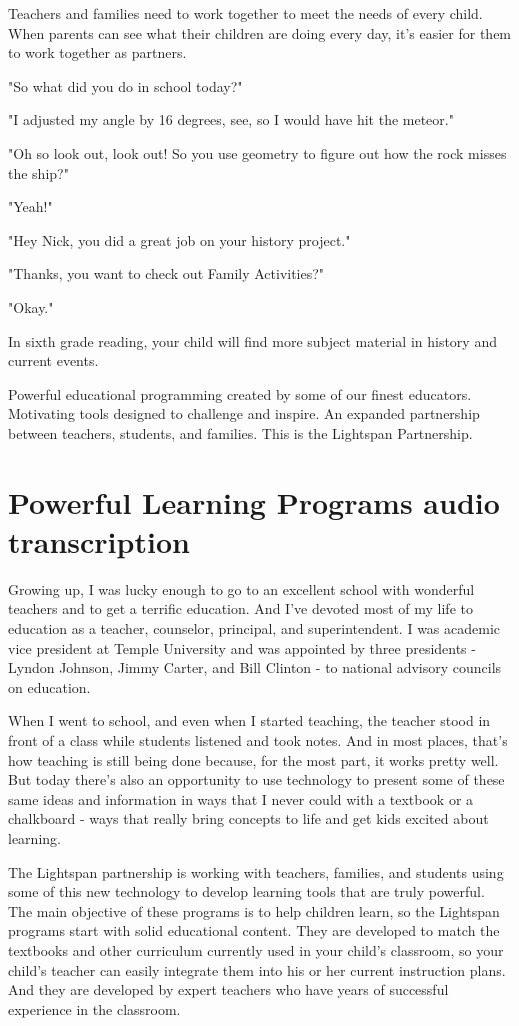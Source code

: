 Teachers and families need to work together to meet the needs of every child.
When parents can see what their children are doing every day, it's easier for them to work together as partners.

"So what did you do in school today?"

"I adjusted my angle by 16 degrees, see, so I would have hit the meteor."

"Oh so look out, look out! So you use geometry to figure out how the rock misses the ship?"

"Yeah!"

"Hey Nick, you did a great job on your history project."

"Thanks, you want to check out Family Activities?"

"Okay."

In sixth grade reading, your child will find more subject material in history and current events.

Powerful educational programming created by some of our finest educators.
Motivating tools designed to challenge and inspire.
An expanded partnership between teachers, students, and families.
This is the Lightspan Partnership.

\section{Powerful Learning Programs audio transcription}

Growing up, I was lucky enough to go to an excellent school with wonderful teachers and to get a terrific education.
And I've devoted most of my life to education as a teacher, counselor, principal, and superintendent.
I was academic vice president at Temple University and was appointed by three presidents - Lyndon Johnson, Jimmy Carter, and Bill Clinton - to national advisory councils on education.

When I went to school, and even when I started teaching, the teacher stood in front of a class while students listened and took notes.
And in most places, that's how teaching is still being done because, for the most part, it works pretty well.
But today there's also an opportunity to use technology to present some of these same ideas and information in ways that I never could with a textbook or a chalkboard - ways that really bring concepts to life and get kids excited about learning.

The Lightspan partnership is working with teachers, families, and students using some of this new technology to develop learning tools that are truly powerful.
The main objective of these programs is to help children learn, so the Lightspan programs start with solid educational content.
They are developed to match the textbooks and other curriculum currently used in your child's classroom, so your child's teacher can easily integrate them into his or her current instruction plans.
And they are developed by expert teachers who have years of successful experience in the classroom.

